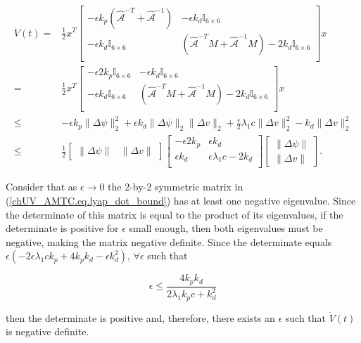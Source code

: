 \begin{align}
\dot{V}(t) =&\frac{1}{2} x^T \left[\begin{array}{cc}
  -\epsilon k_p \left(\hat{\mathcal{A}}^{-T}+\hat{\mathcal{A}}^{-1}\right) &
 -\epsilon k_d \mathbb{I}_{6 \times 6}        \\
  -\epsilon k_d \mathbb{I}_{6 \times 6}              &  
\left(\hat{\mathcal{A}}^{-T} M +\hat{\mathcal{A}}^{-1}
M\right)- 2k_d\mathbb{I}_{6 \times 6}                \\
\end{array} \right] x
\nonumber \\
 =&\frac{1}{2} x^T \left[\begin{array}{cc}
  -\epsilon2k_p\mathbb{I}_{6 \times 6}  &
 -\epsilon k_d \mathbb{I}_{6 \times 6}        \\
  -\epsilon k_d \mathbb{I}_{6 \times 6}              &  
\left(\hat{\mathcal{A}}^{-T} M +\hat{\mathcal{A}}^{-1}
M\right)- 2k_d\mathbb{I}_{6 \times 6}                \\
\end{array} \right] x
\nonumber \\
\leq& -\epsilon  k_p \|\Delta\psi\|_2^2+\epsilon k_d\|\Delta
\psi\|_2\|\Delta v\|_2 +\frac{\epsilon}{2}\lambda_1 c \|\Delta v\|^2_2
-  k_d \|\Delta v\|^2_2
\nonumber \\
 \leq&\frac{1}{2}\left[\begin{array}{cc}
   \|\Delta \psi\| & \|\Delta v\|
   \end{array} \right] 
  \left[\begin{array}{cc}
  -\epsilon 2 k_p  & \epsilon k_d    \\
 \epsilon k_d      &   \epsilon \lambda_1 c- 2k_d\\
  \end{array} \right] 
\left[\begin{array}{c}
   \|\Delta \psi\| \\ \|\Delta v\|
   \end{array} \right]. 
\label{chUV_AMTC.eq.lyap_dot_bound}
\end{align}

\noindent Consider that as $\epsilon \to 0$ the 2-by-2 symmetric
matrix in (\ref{chUV_AMTC.eq.lyap_dot_bound}) has at least one
negative eigenvalue. Since the determinate of this matrix is equal to
the product of its eigenvalues, if the determinate is positive for
$\epsilon$ small enough, then both eigenvalues must be negative,
making the matrix negative definite.  Since the determinate equals
$\epsilon\left(-2\epsilon\lambda_1 c k_p +4k_pk_d- \epsilon k_d^2
\right)$, $\forall\epsilon$ such that

\begin{equation}
\epsilon \leq \frac{4 k_p k_d}{2 \lambda_1 k_p c +k_d^2}
\end{equation}

\noindent then the determinate is positive and, therefore, there
exists an $\epsilon$ such that $\dot{V}(t)$ is negative definite.
